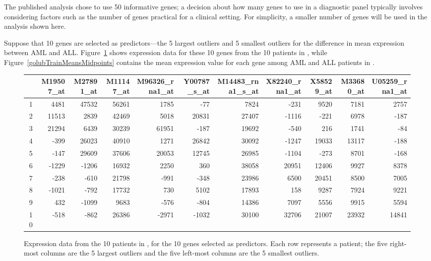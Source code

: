 The published analysis chose to use 50 informative genes; a decision about how many genes to use in a diagnostic panel typically involves considering factors such as the number of genes practical for a clinical setting. For simplicity, a smaller number of genes will be used in the analysis shown here. 

Suppose that 10 genes are selected as predictors---the 5 largest outliers and 5 smallest outliers for the difference in mean expression between AML and ALL. Figure~\ref{golubTestData} shows expression data for these 10 genes from the 10 patients in , while Figure~\ref{golubTrainMeansMidpoints} contains the mean expression value for each gene among AML and ALL patients in .

\textD{\newpage}

\begin{figure}[h]
	\tiny
	\centering
	\begin{tabular}{r|rrrrr|rrrrr}
		\hline
		& M19507\_at & M27891\_at & M11147\_at & M96326\_rna1\_at & Y00787\_s\_at & M14483\_rna1\_s\_at & X82240\_rna1\_at & X58529\_at & M33680\_at & U05259\_rna1\_at \\ 
		\hline
		1 & 4481 & 47532 & 56261 & 1785 & -77 & 7824 & -231 & 9520 & 7181 & 2757 \\ 
		2 & 11513 & 2839 & 42469 & 5018 & 20831 & 27407 & -1116 & -221 & 6978 & -187 \\ 
		3 & 21294 & 6439 & 30239 & 61951 & -187 & 19692 & -540 & 216 & 1741 & -84 \\ 
		4 & -399 & 26023 & 40910 & 1271 & 26842 & 30092 & -1247 & 19033 & 13117 & -188 \\ 
		5 & -147 & 29609 & 37606 & 20053 & 12745 & 26985 & -1104 & -273 & 8701 & -168 \\ 
		6 & -1229 & -1206 & 16932 & 2250 & 360 & 38058 & 20951 & 12406 & 9927 & 8378 \\ 
		7 & -238 & -610 & 21798 & -991 & -348 & 23986 & 6500 & 20451 & 8500 & 7005 \\ 
		8 & -1021 & -792 & 17732 & 730 & 5102 & 17893 & 158 & 9287 & 7924 & 9221 \\ 
		9 & 432 & -1099 & 9683 & -576 & -804 & 14386 & 7097 & 5556 & 9915 & 5594 \\ 
		10 & -518 & -862 & 26386 & -2971 & -1032 & 30100 & 32706 & 21007 & 23932 & 14841 \\ 
		\hline
	\end{tabular}
	\caption{Expression data from the 10 patients in , for the 10 genes selected as predictors. Each row represents a patient; the five right-most columns are the 5 largest outliers and the five left-most columns are the 5 smallest outliers.}
	\label{golubTestData}
\end{figure}


